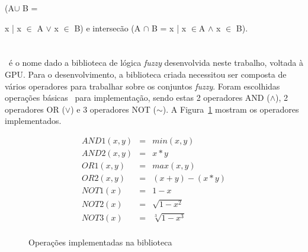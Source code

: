 \documentclass[12pt]{article}
\begin{document}
(A\begin{math} \cup \end{math} B ={ x | x \begin{math}\in \end{math} A \begin{math}\vee \end{math} x \begin{math}\in \end{math} B) e intersecão (A \begin{math} \cap \end{math} B = 
x | x \begin{math}\in \end{math}A \begin{math}\wedge \end{math} x \begin{math}\in \end{math} B).  



\section{\libname}
\label{sec:lib}

	\libname~é o nome dado a biblioteca de lógica \textit{fuzzy} desenvolvida neste trabalho, voltada à GPU. Para o desenvolvimento, a biblioteca criada necessitou ser composta de vários operadores para trabalhar sobre os conjuntos \textit{fuzzy}. Foram escolhidas operações básicas~\cite{klir:95} para implementação, sendo estas 2 operadores AND ($\wedge$), 2 operadores OR ($\vee$) e 3 operadores NOT ($\sim$). A Figura~\ref{fig:fuzzyops} mostram os operadores implementados.
	
\begin{figure}[!h]
\centering

\[ \begin{array}{ccc}
	AND1(x, y) & = & min(x, y) \\
	AND2(x, y) & = & x * y \\
	OR1(x, y) & = & max(x, y) \\
	OR2(x, y) & = & (x + y) - (x * y)\\
	NOT1(x) & = & 1 - x \\
	NOT2(x) & = & \sqrt{1-x^2} \\
	NOT3(x) & = & \sqrt[3]{1-x^3} \\
\end{array} \]
\caption{Operações implementadas na biblioteca~\libname}
\label{fig:fuzzyops}
\end{figure}

}
\end{document}
